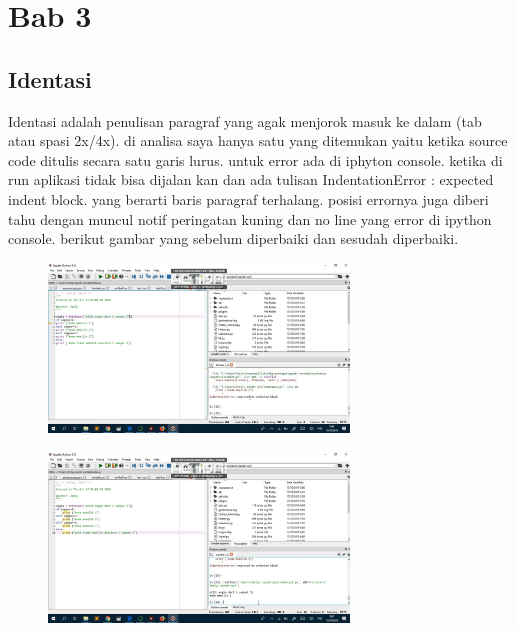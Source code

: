 \chapter{Bab 3}

\section{Identasi}
Identasi adalah penulisan paragraf yang agak menjorok masuk ke dalam (tab atau spasi 2x/4x). di analisa saya hanya satu yang ditemukan yaitu ketika source code ditulis secara satu garis lurus. untuk error ada di iphyton console. ketika di run aplikasi tidak bisa dijalan kan dan ada tulisan IndentationError : expected indent block. yang berarti baris paragraf terhalang. posisi errornya juga diberi tahu dengan muncul notif peringatan kuning dan no line yang error di ipython console. berikut gambar yang sebelum diperbaiki dan sesudah diperbaiki.
\begin{figure}[H]
	\centering
	\includegraphics[width=8cm]{figures/a1.jpg}
\end{figure}

\begin{figure}[H]
	\centering
	\includegraphics[width=8cm]{figures/a2.jpg}
\end{figure}
